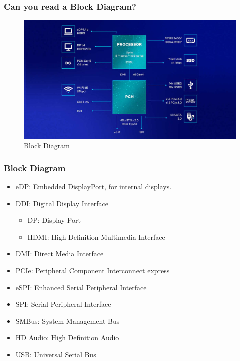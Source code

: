 \documentclass[aspectratio=169, xcolor=table, notheorems, hyperref={pdfpagelabels=false}]{beamer}
\begin{document}
\begin{frame}
\frametitle{Can you read a Block Diagram?}
\begin{figure}
\includegraphics[width=0.79\linewidth]{intel-chipset}
\caption{Block Diagram}
\end{figure}
\end{frame}

\begin{frame}
\frametitle{Block Diagram}
\begin{itemize}
  \item eDP: Embedded DisplayPort, for internal displays.
  \item DDI: Digital Display Interface
\begin{itemize}
  \item DP: Display Port
  \item HDMI: High-Definition Multimedia Interface
\end{itemize}
  \item DMI: Direct Media Interface
  \item PCIe: Peripheral Component Interconnect express
  \item eSPI: Enhanced Serial Peripheral Interface
  \item SPI: Serial Peripheral Interface
  \item SMBus: System Management Bus
  \item HD Audio: High Definition Audio
  \item USB: Universal Serial Bus
\end{itemize}
\end{frame}
\end{document}
